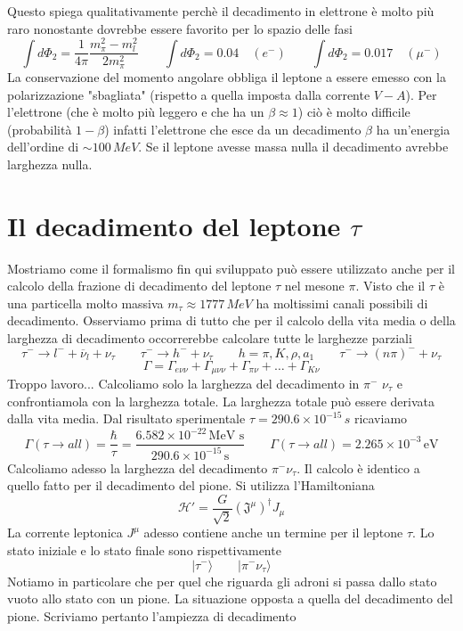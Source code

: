 Questo spiega qualitativamente perchè il decadimento in elettrone è molto più raro nonostante dovrebbe essere favorito per lo spazio delle fasi
$$
\int d\Phi_2 = \frac{1}{4\pi} \frac{m_\pi^2 - m_l^2}{2m_\pi^2} \qquad \int d\Phi_2 = 0.04 \quad (e^-) \quad \quad \int d\Phi_2 = 0.017 \quad (\mu^-)
$$
La conservazione del momento angolare obbliga il leptone a essere emesso con la polarizzazione "sbagliata" (rispetto a quella imposta dalla corrente $V-A$). Per l'elettrone (che è molto più leggero e che ha un $\beta\approx1$) ciò è molto difficile (probabilità $1-\beta$) infatti l'elettrone che esce da un decadimento $\beta$ ha un'energia dell'ordine di $\sim100\,\unit{MeV}$. Se il leptone avesse massa nulla il decadimento avrebbe larghezza nulla.
\section{Il decadimento del leptone $\tau$}
Mostriamo come il formalismo fin qui sviluppato può essere utilizzato anche per il calcolo della frazione di decadimento del leptone $\tau$ nel mesone $\pi$. Visto che il $\tau$ è una particella molto massiva $m_\tau\approx 1777\,\unit{MeV}$ ha moltissimi canali possibili di decadimento. Osserviamo prima di tutto che per il calcolo della vita media o della larghezza di decadimento occorrerebbe calcolare tutte le larghezze parziali
$$
\tau^- \to l^- + \overline{\nu}_l + \nu_\tau \quad \quad \tau^- \to h^- + \nu_\tau \quad \quad h = \pi, K, \rho, a_1 \quad \quad \tau^- \to (n\pi)^- + \nu_\tau
$$
$$
\Gamma = \Gamma_{e\nu\nu} + \Gamma_{\mu\nu\nu} + \Gamma_{\pi\nu} + \dots + \Gamma_{K\nu}
$$
Troppo lavoro... Calcoliamo solo la larghezza del decadimento in $\pi^-$ $\nu_\tau$ e confrontiamola con la larghezza totale. La larghezza totale può essere derivata dalla vita media. Dal risultato sperimentale $\tau=290.6\times10^{-15}\,\unit{s}$ ricaviamo
$$
\Gamma(\tau \to all) = \frac{\hbar}{\tau} = \frac{6.582 \times 10^{-22} \, \text{MeV s}}{290.6 \times 10^{-15} \, \text{s}} \qquad \Gamma(\tau \to all) = 2.265 \times 10^{-3} \, \text{eV}
$$
Calcoliamo adesso la larghezza del decadimento $\pi^-\nu_\tau$. Il calcolo è identico a quello fatto per il decadimento del pione. Si utilizza l'Hamiltoniana
$$
\mathcal{H}' = \frac{G}{\sqrt{2}} (\mathfrak{J}^\mu)^\dagger J_\mu
$$
La corrente leptonica $J^\mu$ adesso contiene anche un termine per il leptone $\tau$. Lo stato iniziale e lo stato finale sono rispettivamente 
$$
|\tau^-\rangle \quad \quad |\pi^- \nu_\tau\rangle
$$
Notiamo in particolare che per quel che riguarda gli adroni si passa dallo stato vuoto allo stato con un pione. La situazione opposta a quella del decadimento del pione. Scriviamo pertanto l'ampiezza di decadimento
